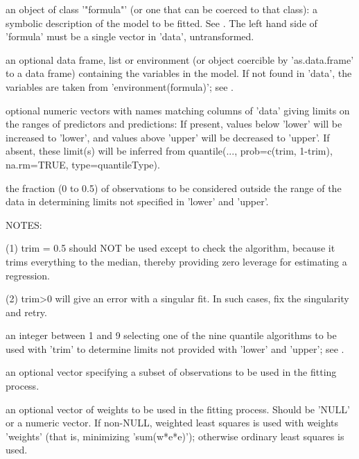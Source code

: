 \documentclass{article}
\begin{document}
\begin{Arguments}
\begin{ldescription}
\item[\code{formula}] an object of class '"formula"' (or one that can be coerced to that
class): a symbolic description of the model to be fitted.  See
.  The left hand side of 'formula' must be a single vector
in 'data', untransformed.  

\item[\code{data}] an optional data frame, list or environment (or object coercible by
'as.data.frame' to a data frame) containing the variables in the
model.  If not found in 'data', the variables are taken from
'environment(formula)';  see . 

\item[\code{lower, upper}] optional numeric vectors with names matching columns of 'data'
giving limits on the ranges of predictors and predictions:  If
present, values below 'lower' will be increased to 'lower', and
values above 'upper' will be decreased to 'upper'.  If absent, these
limit(s) will be inferred from quantile(..., prob=c(trim, 1-trim),
na.rm=TRUE, type=quantileType).  

\item[\code{trim}] the fraction (0 to 0.5) of observations to be considered outside the
range of the data in determining limits not specified in 'lower' and
'upper'.  

NOTES:

(1) trim = 0.5 should NOT be used except to check  the algorithm,
because it trims everything to the median, thereby providing zero
leverage for estimating a regression.

(2) trim>0 will give an error with a singular fit.  In such cases,
fix the singularity and retry.  

\item[\code{quantileType}] an integer between 1 and 9 selecting one of the nine quantile
algorithms to be used with 'trim' to determine limits not provided
with 'lower' and 'upper';  see   .  

\item[\code{ subset }] an optional vector specifying a subset of observations to be used in
the fitting process. 

\item[\code{ weights }] an optional vector of weights to be used in the fitting process.
Should be 'NULL' or a numeric vector. If non-NULL, weighted least
squares is used with weights 'weights' (that is, minimizing
'sum(w*e*e)'); otherwise ordinary least squares is used.


\end{ldescription}
\end{Arguments}
\end{document}
